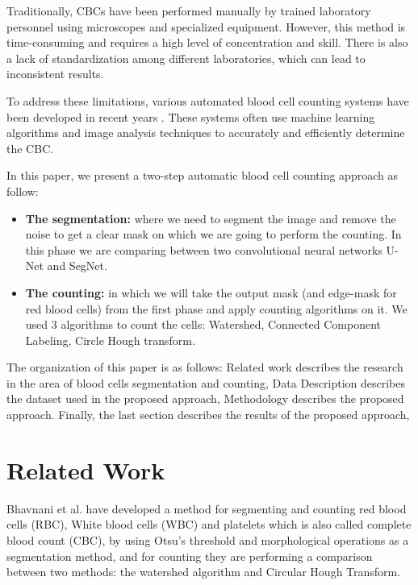 \documentclass[conference]{IEEEtran}
\begin{document}
Traditionally, CBCs have been performed manually by trained laboratory personnel using microscopes and specialized equipment. However, this method is time-consuming and requires a high level of concentration and skill. There is also a lack of standardization among different laboratories, which can lead to inconsistent results.

To address these limitations, various automated blood cell counting systems have been developed in recent years \cite{asgari2021deep}. These systems often use machine learning algorithms and image analysis techniques to accurately and efficiently determine the CBC.

In this paper, we present a two-step automatic blood cell counting approach as follow:
\begin{itemize}
    \item \textbf{The segmentation:} where we need to segment the image and remove the noise to get a clear mask on which we are going to perform the counting. In this phase we are comparing between two convolutional neural networks U-Net and SegNet.
    \item \textbf{The counting:} in which we will take the output mask (and edge-mask for red blood cells) from the first phase and apply counting algorithms on it. We used 3 algorithms to count the cells: Watershed, Connected Component Labeling, Circle Hough transform.\\
\end{itemize}

The organization of this paper is as follows: Related work describes the research in the area of blood cells segmentation and counting, Data Description describes the dataset used in the proposed approach, Methodology describes the proposed approach. Finally, the last section describes the results of the proposed approach, 

\section{Related Work}

Bhavnani et al. \cite{bhavnani2016segmentation} have developed a method for segmenting and counting red blood cells (RBC), White blood cells (WBC) and platelets which is also called complete blood count (CBC), by using Otsu’s threshold and morphological operations as a segmentation method, and for counting they are performing a comparison between two methods: the watershed algorithm and Circular Hough Transform.
\end{document}
